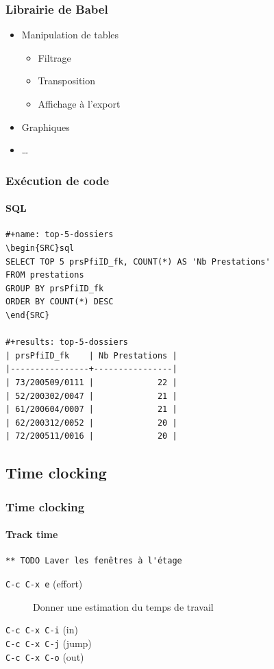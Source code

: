 \documentclass[presentation,t,hideothersubsections]{beamer}
\begin{document}
\begin{frame}
\frametitle{Librairie de Babel}
\label{sec-5-7-6}


\begin{itemize}
\item Manipulation de tables
\begin{itemize}
\item Filtrage
\item Transposition
\item Affichage à l'export
\end{itemize}
\item Graphiques
\item \ldots{}
\end{itemize}
\end{frame}
\begin{frame}[fragile]
\frametitle{Exécution de code}
\framesubtitle{SQL}
\label{sec-5-7-7}



\lstset{language=org}
\begin{lstlisting}
#+name: top-5-dossiers
\begin{SRC}sql
SELECT TOP 5 prsPfiID_fk, COUNT(*) AS 'Nb Prestations'
FROM prestations
GROUP BY prsPfiID_fk
ORDER BY COUNT(*) DESC
\end{SRC}

#+results: top-5-dossiers
| prsPfiID_fk    | Nb Prestations |
|----------------+----------------|
| 73/200509/0111 |             22 |
| 52/200302/0047 |             21 |
| 61/200604/0007 |             21 |
| 62/200312/0052 |             20 |
| 72/200511/0016 |             20 |
\end{lstlisting}
\end{frame}
\subsection{Time clocking}
\label{sec-5-8}
\begin{frame}[fragile]
\frametitle{Time clocking}
\framesubtitle{Track time}
\label{sec-5-8-1}



\lstset{language=org}
\begin{lstlisting}
** TODO Laver les fenêtres à l'étage
\end{lstlisting}

\begin{description}
\item[\texttt{C-c C-x e} (effort)] Donner une estimation du temps de travail
\item[\texttt{C-c C-x C-i} (in)] 
\item[\texttt{C-c C-x C-j} (jump)] 
\item[\texttt{C-c C-x C-o} (out)] 
\end{description}
\end{frame}
\end{document}
